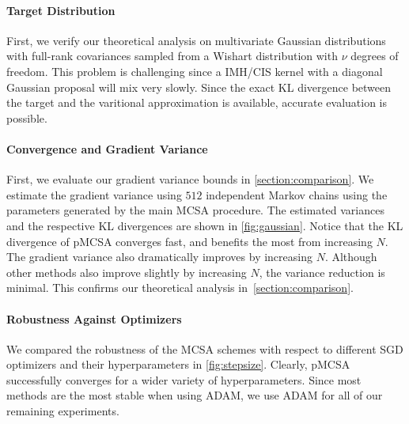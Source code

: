 \paragraph{Target Distribution}
First, we verify our theoretical analysis on multivariate Gaussian distributions with full-rank covariances sampled from a Wishart distribution with  \(\nu\) degrees of freedom.
This problem is challenging since a IMH/CIS kernel with a diagonal Gaussian proposal will mix very slowly.
Since the exact KL divergence between the target and the varitional approximation is available, accurate evaluation is possible.

\vspace{-0.1in}
\paragraph{Convergence and Gradient Variance}
First, we evaluate our gradient variance bounds in \cref{section:comparison}.
We estimate the gradient variance using \(512\) independent Markov chains using the parameters generated by the main MCSA procedure.
The estimated variances and the respective KL divergences are shown in \cref{fig:gaussian}.
Notice that the KL divergence of pMCSA converges fast, and benefits the most from increasing \(N\).
The gradient variance also dramatically improves by increasing \(N\).
Although other methods also improve slightly by increasing \(N\), the variance reduction is minimal.
This confirms our theoretical analysis in~\cref{section:comparison}.

\vspace{-0.1in}
\paragraph{Robustness Against Optimizers}
We compared the robustness of the MCSA schemes with respect to different SGD optimizers and their hyperparameters in \cref{fig:stepsize}.
Clearly, pMCSA successfully converges for a wider variety of hyperparameters.
Since most methods are the most stable when using ADAM, we use ADAM for all of our remaining experiments.


